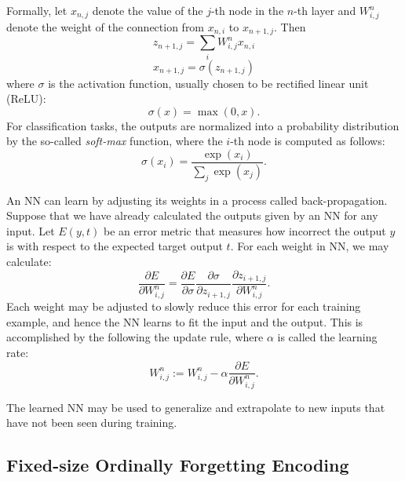 \documentclass[11pt,a4paper]{article}
\begin{document}
Formally, let $x_{n,j}$ denote the value of the $j$-th node in the
$n$-th layer and $W^n_{i,j}$ denote the weight of the connection from
$x_{n,i}$ to $x_{n+1,j}$. Then
\begin{equation}
z_{n+1,j} = \sum_i W^n_{i,j} x_{n,i}
\end{equation}
\begin{equation}
x_{n+1,j} = \sigma\left(z_{n+1,j}\right)
\end{equation}
where $\sigma$ is the activation function, usually chosen to be 
rectified linear unit (ReLU):
\begin{equation}
\sigma(x) = \max(0, x).
\end{equation}
For classification tasks, the outputs are normalized into a probability distribution by the so-called {\it soft-max} function, where the $i$-th node is computed as follows:
\begin{equation}
\sigma(x_i) =  \frac{\exp(x_i)}{\sum_{j} \exp(x_j)}.
\end{equation}

An NN can learn by adjusting its weights in a process called back-propagation. 
Suppose that we have already calculated the outputs given by an NN for any input.
Let $E(y,t)$ be an error metric that measures how incorrect the output
$y$ is with respect to the expected target output $t$. For each weight
in NN, we may calculate:
\begin{equation}
\frac{\partial E}{\partial W^n_{i,j}} = \frac{\partial E}{\partial
	\sigma} \frac{\partial \sigma}{\partial z_{i+1,j}} \frac{\partial
	z_{i+1,j}}{\partial W^n_{i,j}}.
\end{equation}
Each weight may be adjusted to slowly reduce this error for each training
example, and hence the NN learns to fit the input and the output. 
This is accomplished by the following the update rule, where $\alpha$ is called the learning rate:
\begin{equation}
W^n_{i,j} := W^n_{i,j} - \alpha \frac{\partial E}{\partial
	W^n_{i,j}}.
\end{equation}

The learned NN may be used to generalize and extrapolate to new inputs that have not been seen during training.

\subsection{Fixed-size Ordinally Forgetting Encoding}
\end{document}
